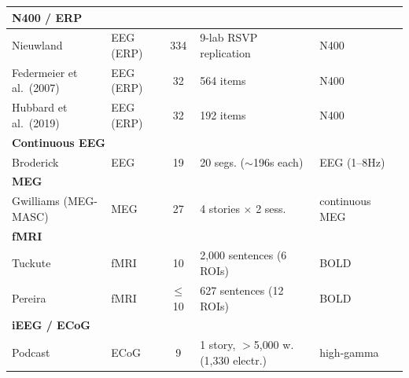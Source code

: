 {\begin{longtable}{@{}p{2.45cm}p{1.5cm}cp{2.6cm}p{1.8cm}>{\raggedright\arraybackslash}p{2.0cm}@{}}
\midrule
\multicolumn{6}{l}{\textbf{N400 / ERP}} \\
\midrule
\small Nieuwland & \small EEG (ERP) & \small 334 & \small 9-lab RSVP replication & \small N400 & \scriptsize \citep{nieuwland2018largescale} \\
\small Federmeier et al.\ (2007) & \small EEG (ERP) & \small 32 & \small 564 items & \small N400 & \scriptsize \citep{federmeier2007multiple,szewczyk2022context} \\
\small Hubbard et al.\ (2019) & \small EEG (ERP) & \small 32 & \small 192 items & \small N400 & \scriptsize \citep{szewczyk2022context} \\
\midrule
\multicolumn{6}{l}{\textbf{Continuous EEG}} \\
\midrule
\small Broderick & \small EEG & \small 19 & \small 20 segs. ($\sim$196s each) & \small EEG (1--8Hz) & \scriptsize \citep{broderick2018electrophysiological} \\
\midrule
\multicolumn{6}{l}{\textbf{MEG}} \\
\midrule
\small Gwilliams (MEG-MASC) & \small MEG & \small 27 & \small 4 stories $\times$ 2 sess. & \small continuous MEG & \scriptsize \citep{gwilliams2022neural} \\
\midrule
\multicolumn{6}{l}{\textbf{fMRI}} \\
\midrule
\small Tuckute & \small fMRI & \small 10 & \small 2{,}000 sentences (6 ROIs) & \small BOLD & \scriptsize \citep{tuckute2024driving} \\
\small Pereira & \small fMRI & \small $\leq$10 & \small 627 sentences (12 ROIs) & \small BOLD & \scriptsize \citep{pereira2018toward} \\
\midrule
\multicolumn{6}{l}{\textbf{iEEG / ECoG}} \\
\midrule
\small Podcast & \small ECoG & \small 9 & \small 1 story, $>$5{,}000 w. (1{,}330 electr.) & \small high-gamma & \scriptsize \citep{zada2025podcast} \\
\end{longtable}
}
